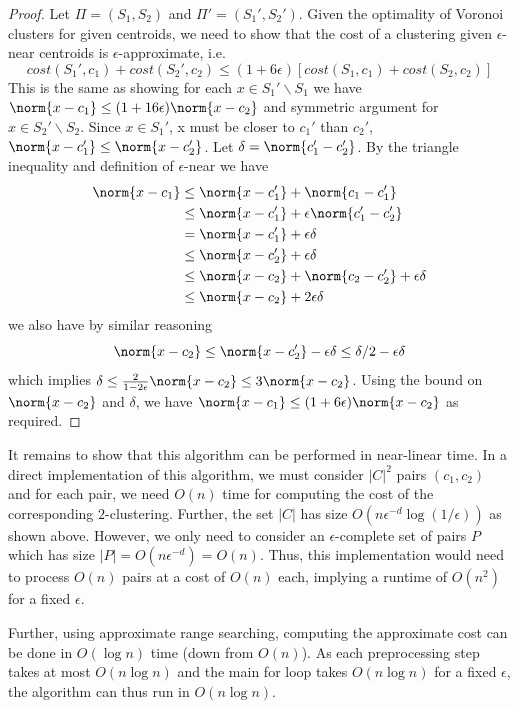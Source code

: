 \begin{proof}
Let $\Pi = (S_1, S_2)$ and $\Pi' = (S_1', S_2')$. Given the optimality of Voronoi
  clusters for given centroids, we need to show that the cost of a clustering
  given $\epsilon$-near centroids is $\epsilon$-approximate, i.e. $$cost(S_1', c_1)
  + cost(S_2' , c_2) \leq (1 + 6\epsilon)[cost(S_1, c_1) + cost(S_2 , c_2)]$$ This
  is the same as showing for each $x \in S_1' \backslash S_1$ we have $\norm{x-c_1}
  \leq (1+16\epsilon)\norm{x-c_2}$ and symmetric argument for $x \in S_2' \backslash S_2$.
  Since $x \in S_1'$, x must be closer to $c_1'$ than $c_2'$, $\norm{x-c_1'}\leq  \norm{x-c_2'}$.
  Let $\delta = \norm{c_1'-c_2'}$. By the triangle inequality and definition of $\epsilon$-near we have
\begin{align*}
    \norm{x-c_1} &  \leq \norm{x-c_1'} + \norm{c_1-c_1'} \\
    & \leq \norm{x-c_1'} + \epsilon \norm{c_1'-c_2'}\\
    & = \norm{x-c_1'} + \epsilon \delta \\
    & \leq \norm{x-c_2'}+ \epsilon \delta \\
    & \leq \norm{x-c_2} + \norm{c_2-c_2'} + \epsilon \delta \\
    & \leq \norm{x-c_2} + 2\epsilon \delta
\end{align*}
we also have by similar reasoning
$$\norm{x-c_2}\leq \norm{x-c_2'} - \epsilon \delta \leq \delta/2 - \epsilon \delta$$
which implies $\delta \leq \frac{2}{1-2\epsilon}\norm{x-c_2}\leq 3 \norm{x-c_2}$. Using the bound on $\norm{x-c_2}$ and $\delta$, we have $\norm{x-c_1} \leq (1+ 6\epsilon)\norm{x-c_2}$ as required. 
\end{proof}

It remains to show that this algorithm can be performed in near-linear time.
In a direct implementation of this algorithm, we must consider $|C|^2$ pairs
$(c_1,c_2)$ and for each pair, we need $O(n)$ time for computing the cost of
the corresponding $2$-clustering. Further, the set $|C|$ has size $O(n \epsilon^{-d} \log (1/\epsilon))$
as shown above. However, we only need to consider an $\epsilon$-complete set of
pairs $P$ which has size $|P|=O(n \epsilon^{-d})=O(n)$. Thus, this implementation
would need to process $O(n)$ pairs at a cost of $O(n)$ each, implying a runtime of
$O(n^2)$ for a fixed $\epsilon$.

Further, using approximate range searching, computing the approximate cost can be done in $O(\log n)$ time (down from $O(n)$). As each preprocessing step takes at most $O(n \log n)$ and the main for loop takes $O(n \log n)$ for a fixed $\epsilon$, the algorithm can thus run in $O(n \log n)$.

